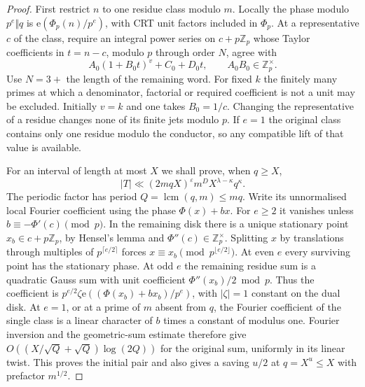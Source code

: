 \documentclass[11pt,letterpaper]{article}
\theoremstyle{definition}
\newcommand{\Z}{\mathbb Z}
\newcommand{\e}{\mathrm e}
\newcommand{\eps}{\varepsilon}
\DeclareMathOperator{\lcm}{lcm}
\begin{document}
\begin{proof}
First restrict $n$ to one residue class modulo $m$. Locally the phase
modulo $p^e\Vert q$ is $\e(\Phi_p(n)/p^e)$, with CRT unit factors
included in $\Phi_p$. At a representative $c$ of the class, require an
integral power series on $c+p\Z_p$ whose Taylor coefficients in $t=n-c$,
modulo $p$ through order $N$, agree with
\[
 A_0(1+B_0 t)^v+C_0+D_0t,\qquad A_0B_0\in\Z_p^\times .
\]
Use $N=3+$ the length of the remaining word. For fixed $k$ the finitely
many primes at which a denominator, factorial or required coefficient is
not a unit may be excluded. Initially $v=k$ and one takes $B_0=1/c$.
Changing the representative of a residue changes none of its finite
jets modulo $p$. If $e=1$ the original class contains only one residue
modulo the conductor, so any compatible lift of that value is available.

For an interval of length at most $X$ we shall prove, when $q\ge X$,
\begin{equation}\label{eq:single}
 |T|\ll (2mqX)^\eps m^D X^{\lambda-\kappa}q^\kappa .
\end{equation}
The periodic factor has period $Q=\lcm(q,m)\le mq$. Write its unnormalised
local Fourier coefficient using the phase $\Phi(x)+b x$. For $e\ge2$
it vanishes unless $b\equiv-\Phi'(c)\pmod p$. In the remaining disk
there is a unique stationary point $x_b\in c+p\Z_p$, by Hensel's lemma
and $\Phi''(c)\in\Z_p^\times$. Splitting $x$ by translations through
multiples of $p^{\lceil e/2\rceil}$ forces $x\equiv x_b\pmod{
p^{\lfloor e/2\rfloor}}$. At even $e$ every surviving point has the
stationary phase. At odd $e$ the remaining residue sum is a quadratic
Gauss sum with unit coefficient $\Phi''(x_b)/2\bmod p$. Thus the
coefficient is $p^{e/2}\zeta\e((\Phi(x_b)+b x_b)/p^e)$, with
$|\zeta|=1$ constant on the dual disk. At $e=1$, or at a prime of
$m$ absent from $q$, the Fourier coefficient of the single class is a
linear character of $b$ times a constant of modulus one.
Fourier inversion and the geometric-sum estimate therefore give
$O((X/\sqrt Q+\sqrt Q)\log(2Q))$ for the original sum, uniformly
in its linear twist. This proves the initial pair and also gives a
saving $u/2$ at $q=X^u\le X$ with prefactor $m^{1/2}$.


\end{proof}
\end{document}
